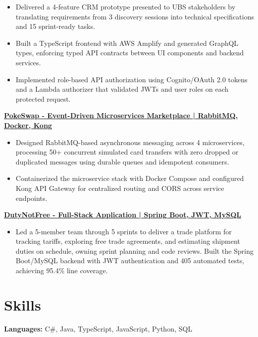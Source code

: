 \documentclass[10pt, a4paper]{article}
\newenvironment{resumeitemize}{
    \begin{itemize}[
        leftmargin=1.15em,
        itemsep=0.12em,
        topsep=0.12em,
        parsep=0.04em,
        partopsep=0pt
    ]
}{
    \end{itemize}
}
\begin{document}
\begin{resumeitemize}
    \item Delivered a 4-feature CRM prototype presented to UBS stakeholders by translating requirements from 3 discovery sessions into technical specifications and 15 sprint-ready tasks.
    \item Built a TypeScript frontend with AWS Amplify and generated GraphQL types, enforcing typed API contracts between UI components and backend services.
    \item Implemented role-based API authorization using Cognito/OAuth 2.0 tokens and a Lambda authorizer that validated JWTs and user roles on each protected request.
\end{resumeitemize}

\textbf{\href{https://github.com/leandrogay/PokeSwap}{PokeSwap - Event-Driven Microservices Marketplace | RabbitMQ, Docker, Kong}}

\begin{resumeitemize}
    \item Designed RabbitMQ-based asynchronous messaging across 4
        microservices, processing 50+ concurrent simulated card transfers with
        zero dropped or duplicated messages using durable queues and idempotent
        consumers.

    \item Containerized the microservice stack with Docker Compose and configured Kong API Gateway for centralized routing and CORS across service endpoints.
\end{resumeitemize}

\textbf{\href{https://github.com/NickySeah/DutyNotFree}{DutyNotFree - Full-Stack Application | Spring Boot, JWT, MySQL}}

\begin{resumeitemize}
    \item Led a 5-member team through 5 sprints to deliver a trade platform for tracking tariffs, exploring free trade agreements, and estimating shipment duties on schedule, owning sprint planning and code reviews. Built the Spring Boot/MySQL backend with JWT authentication and 405 automated tests, achieving 95.4\% line coverage.
\end{resumeitemize}

\section{Skills}

\textbf{Languages:} C\#, Java, TypeScript, JavaScript, Python, SQL \\ 
\end{document}
